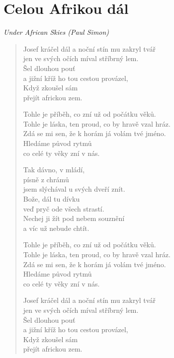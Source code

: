 \section*{Celou Afrikou dál}

\textit{Under African Skies (Paul Simon)}

\begin{verse}
Josef kráčel dál a noční stín mu zakryl tvář \\
jen ve svých očích míval stříbrný lem. \\
Šel dlouhou pouť \\
a jižní kříž ho tou cestou provázel, \\
Když zkoušel sám \\
přejít africkou zem.

Tohle je příběh, co zní už od počátku věků. \\
Tohle je láska, ten proud, co by hravě vzal hráz. \\
Zdá se mi sen, že k horám já volám tvé jméno. \\
Hledáme původ rytmů \\
co celé ty věky zní v nás.

Tak dávno, v mládí, \\
písně z chrámů \\
jsem slýchával u svých dveří znít. \\
Bože, dál tu dívku \\
veď pryč ode všech strastí. \\
Nechej ji žít pod nebem souznění \\
a víc už nebude chtít.

Tohle je příběh, co zní už od počátku věků. \\
Tohle je láska, ten proud, co by hravě vzal hráz. \\
Zdá se mi sen, že k horám já volám tvé jméno. \\
Hledáme původ rytmů \\
co celé ty věky zní v nás.

Josef kráčel dál a noční stín mu zakryl tvář \\
jen ve svých očích míval stříbrný lem. \\
Šel dlouhou pouť \\
a jižní kříž ho tou cestou provázel, \\
Když zkoušel sám \\
přejít africkou zem.
\end{verse}
